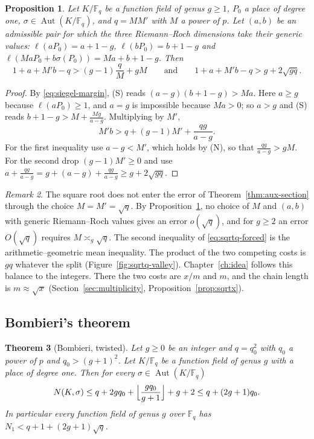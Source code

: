 \documentclass[11pt]{amsbook}
\theoremstyle{plain}
\newtheorem{theorem}{Theorem}[section]
\newtheorem{proposition}[theorem]{Proposition}
\theoremstyle{definition}
\theoremstyle{remark}
\newtheorem{remark}[theorem]{Remark}
\numberwithin{equation}{section}
\numberwithin{figure}{chapter}
\numberwithin{table}{chapter}
\newcommand{\F}{\mathbb{F}}
\DeclareMathOperator{\Aut}{Aut}
\begin{document}
\begin{proposition}\label{prop:sqrtq-forced}
Let $K/\F_q$ be a function field of genus $g\ge1$, $P_0$ a place of
degree one, $\sigma\in\Aut(K/\F_q)$, and $q=MM'$ with $M$ a power
of $p$. Let $(a,b)$ be an admissible pair for which the three
Riemann--Roch dimensions take their generic values:
$\ell(aP_0)=a+1-g$, $\ell(bP_0)=b+1-g$ and
$\ell(MaP_0+b\sigma(P_0))=Ma+b+1-g$. Then
\begin{equation}\label{eq:sqrtq-forced}
1+a+M'b-q>(g-1)\frac qM+gM\qquad\text{and}\qquad
1+a+M'b-q>g+2\sqrt{gq}.
\end{equation}
\end{proposition}

\begin{proof}
By \eqref{eq:siegel-margin}, (S) reads $(a-g)(b+1-g)>Ma$. Here
$a\ge g$ because $\ell(aP_0)\ge1$, and $a=g$ is impossible because
$Ma>0$; so $a>g$ and (S) reads $b+1-g>M+\frac{Mg}{a-g}$.
Multiplying by $M'$,
\[
M'b>q+(g-1)M'+\frac{qg}{a-g}.
\]
For the first inequality use $a-g<M'$, which holds by (N), so that
$\frac{qg}{a-g}>gM$. For the second drop $(g-1)M'\ge0$ and use
$a+\frac{qg}{a-g}=g+(a-g)+\frac{qg}{a-g}\ge g+2\sqrt{gq}$.
\end{proof}

\begin{remark}\label{rem:sqrtq}
The square root does not enter the error of
Theorem~\ref{thm:aux-section} through the choice $M=M'=\sqrt q$.
By Proposition~\ref{prop:sqrtq-forced}, no choice of $M$ and $(a,b)$
with generic Riemann--Roch values gives an error $o(\sqrt q)$, and
for $g\ge2$ an error $O(\sqrt q)$ requires $M\asymp_g\sqrt q$. The
second inequality of \eqref{eq:sqrtq-forced} is the
arithmetic--geometric mean inequality. The product of the two
competing costs is $gq$ whatever the split
(Figure~\ref{fig:sqrtq-valley}). Chapter~\ref{ch:idea} follows this
balance to the integers. There the two costs are $x/m$ and $m$, and
the chain length is $m\approx\sqrt x$
(Section~\ref{sec:multiplicity}, Proposition~\ref{prop:sqrtx}).
\end{remark}

\subsection{Bombieri's theorem}

\begin{theorem}[Bombieri, twisted]\label{thm:bombieri}
Let $g\ge0$ be an integer and $q=q_0^2$ with $q_0$ a power of $p$
and $q_0>(g+1)^2$. Let $K/\F_q$ be a function field of genus $g$
with a place of degree one. Then for every $\sigma\in\Aut(K/\F_q)$
\begin{equation}\label{eq:bombieri}
N(K,\sigma)\le q+2gq_0+\Bigl\lfloor\frac{gq_0}{g+1}\Bigr\rfloor+g+2
\le q+(2g+1)q_0.
\end{equation}
In particular every function field of genus $g$ over $\F_q$ has
$N_1<q+1+(2g+1)\sqrt q$.
\end{theorem}
\end{document}
